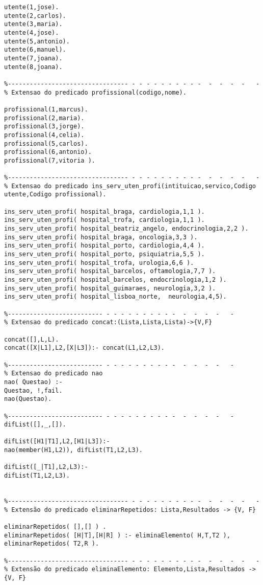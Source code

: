 \documentclass[pdftex,12pt,a4paper]{report}
\begin{document}
\begin{appendices}
\begin{Verbatim}
utente(1,jose).  
utente(2,carlos). 
utente(3,maria). 
utente(4,jose).   
utente(5,antonio). 
utente(6,manuel).  
utente(7,joana).
utente(8,joana).  

%--------------------------------- - - - - - - - - - -  -  -  -  -   -
% Extensao do predicado profissional(codigo,nome).

profissional(1,marcus).
profissional(2,maria).
profissional(3,jorge).
profissional(4,celia).
profissional(5,carlos).
profissional(6,antonio).
profissional(7,vitoria ).

%--------------------------------- - - - - - - - - - -  -  -  -  -   -
% Extensao do predicado ins_serv_uten_profi(intituicao,servico,Codigo utente,Codigo profissional).

ins_serv_uten_profi( hospital_braga, cardiologia,1,1 ).
ins_serv_uten_profi( hospital_trofa, cardiologia,1,1 ).
ins_serv_uten_profi( hospital_beatriz_angelo, endocrinologia,2,2 ).
ins_serv_uten_profi( hospital_braga, oncologia,3,3 ).
ins_serv_uten_profi( hospital_porto, cardiologia,4,4 ).
ins_serv_uten_profi( hospital_porto, psiquiatria,5,5 ).
ins_serv_uten_profi( hospital_trofa, urologia,6,6 ).
ins_serv_uten_profi( hospital_barcelos, oftamologia,7,7 ).
ins_serv_uten_profi( hospital_barcelos, endocrinologia,1,2 ).
ins_serv_uten_profi( hospital_guimaraes, neurologia,3,2 ).
ins_serv_uten_profi( hospital_lisboa_norte,  neurologia,4,5).

%-------------------------- - - - - - - - - - -  -  -  -  -   -
% Extensao do predicado concat:(Lista,Lista,Lista)->{V,F}

concat([],L,L).
concat([X|L1],L2,[X|L3]):- concat(L1,L2,L3).

%-------------------------- - - - - - - - - - -  -  -  -  -   -
% Extensao do predicado nao
nao( Questao) :-
Questao, !,fail.
nao(Questao).

%-------------------------- - - - - - - - - - -  -  -  -  -   -
difList([],_,[]).

difList([H1|T1],L2,[H1|L3]):-
nao(member(H1,L2)), difList(T1,L2,L3).

difList([_|T1],L2,L3):-
difList(T1,L2,L3).


%--------------------------------- - - - - - - - - - -  -  -  -  -   -
% Extensão do predicado eliminarRepetidos: Lista,Resultados -> {V, F}

eliminarRepetidos( [],[] ) .
eliminarRepetidos( [H|T],[H|R] ) :- eliminaElemento( H,T,T2 ),
eliminarRepetidos( T2,R ).

%--------------------------------- - - - - - - - - - -  -  -  -  -   -
% Extensão do predicado eliminaElemento: Elemento,Lista,Resultados -> {V, F}


\end{Verbatim}
\end{appendices}
\end{document}
